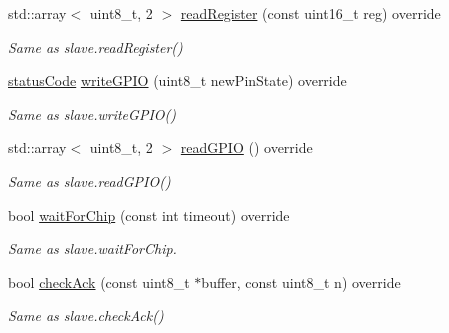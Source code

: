 \begin{DoxyCompactItemize}
\mbox{\label{classnfc_1_1NfcOled_a15c794124696c14893ffcf781609c00e}} 
std\+::array$<$ uint8\+\_\+t, 2 $>$ \hyperlink{classnfc_1_1NfcOled_a15c794124696c14893ffcf781609c00e}{read\+Register} (const uint16\+\_\+t reg) override
\begin{DoxyCompactList}\small\item\em Same as slave.\+read\+Register() \end{DoxyCompactList}\item 
\mbox{\label{classnfc_1_1NfcOled_a93a2097132e92d3bc6f1e1c4c45d364b}} 
\hyperlink{declarations_8h_ae1d20c5a38cae82ccaa6a77be3fd264b}{status\+Code} \hyperlink{classnfc_1_1NfcOled_a93a2097132e92d3bc6f1e1c4c45d364b}{write\+G\+P\+IO} (uint8\+\_\+t new\+Pin\+State) override
\begin{DoxyCompactList}\small\item\em Same as slave.\+write\+G\+P\+I\+O() \end{DoxyCompactList}\item 
\mbox{\label{classnfc_1_1NfcOled_a0dd17c714697e9883aa35962c5229625}} 
std\+::array$<$ uint8\+\_\+t, 2 $>$ \hyperlink{classnfc_1_1NfcOled_a0dd17c714697e9883aa35962c5229625}{read\+G\+P\+IO} () override
\begin{DoxyCompactList}\small\item\em Same as slave.\+read\+G\+P\+I\+O() \end{DoxyCompactList}\item 
\mbox{\label{classnfc_1_1NfcOled_aed3fb53e82dba1bbdc97adb38d6fdb29}} 
bool \hyperlink{classnfc_1_1NfcOled_aed3fb53e82dba1bbdc97adb38d6fdb29}{wait\+For\+Chip} (const int timeout) override
\begin{DoxyCompactList}\small\item\em Same as slave.\+wait\+For\+Chip. \end{DoxyCompactList}\item 
\mbox{\label{classnfc_1_1NfcOled_abac578b4b4a7b4a4c58dbfd4e89a6bf3}} 
bool \hyperlink{classnfc_1_1NfcOled_abac578b4b4a7b4a4c58dbfd4e89a6bf3}{check\+Ack} (const uint8\+\_\+t $\ast$buffer, const uint8\+\_\+t n) override
\begin{DoxyCompactList}\small\item\em Same as slave.\+check\+Ack() \end{DoxyCompactList}\item 

\end{DoxyCompactItemize}
